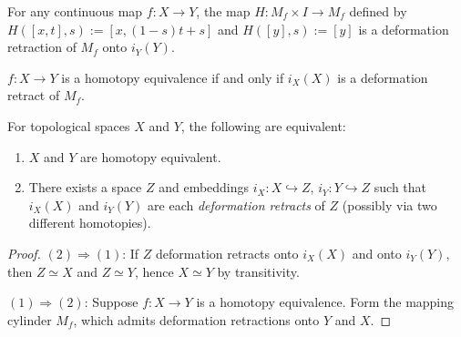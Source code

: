 \begin{lemma}
  For any continuous map $f:X\to Y$, the map $H:M_f\times I \to M_f$ defined by $H([x,t],s):=[x,(1-s)t+ s]$ and $H([y],s):=[y]$ is a deformation retraction of $M_f$ onto $i_Y(Y)$. 
\end{lemma}

\begin{lemma}
  $f:X\to Y$ is a homotopy equivalence if and only if $i_X(X)$ is a deformation retract of $M_f$.
\end{lemma}

\begin{theorem}
For topological spaces $X$ and $Y$, the following are equivalent:
\begin{enumerate}
    \item $X$ and $Y$ are homotopy equivalent.
    \item There exists a space $Z$ and embeddings $i_X:X\hookrightarrow Z$, $i_Y:Y\hookrightarrow Z$
                such that $i_X(X)$ and $i_Y(Y)$ are each \emph{deformation retracts} of $Z$
                (possibly via two different homotopies).
\end{enumerate}
\end{theorem}

\begin{proof}
$(2)\Rightarrow(1)$: If $Z$ deformation retracts onto $i_X(X)$ and onto $i_Y(Y)$, then
$Z\simeq X$ and $Z\simeq Y$, hence $X\simeq Y$ by transitivity.

$(1)\Rightarrow(2)$: Suppose $f:X\to Y$ is a homotopy equivalence. Form the mapping cylinder
$M_f$, which admits deformation retractions onto $Y$ and $X$.
\end{proof}





\newpage

